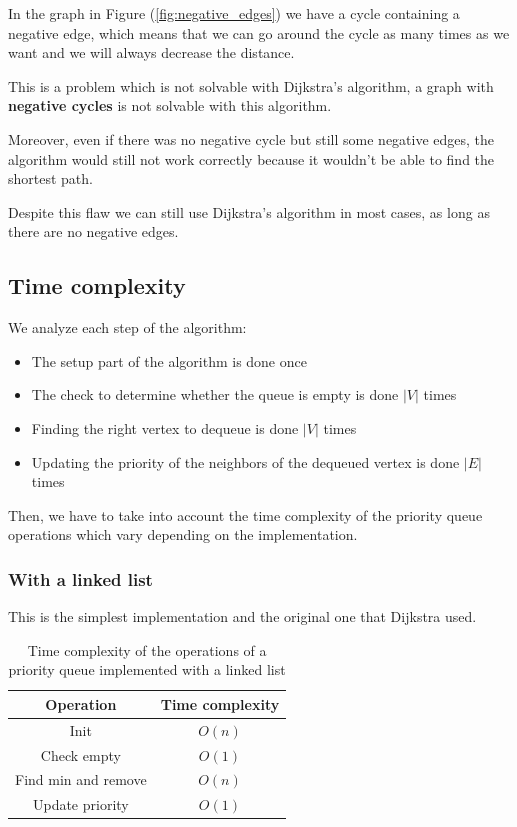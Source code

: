\documentclass[12pt]{extarticle}
\begin{document}
In the graph in Figure (\ref{fig:negative_edges}) we have a cycle containing a negative edge, which means that we can go around the cycle as many times as we want and we will always decrease the distance.

This is a problem which is not solvable with Dijkstra's algorithm, a graph with \textbf{negative cycles} is not solvable with this algorithm.

Moreover, even if there was no negative cycle but still some negative edges, the algorithm would still not work correctly because it wouldn't be able to find the shortest path.

Despite this flaw we can still use Dijkstra's algorithm in most cases, as long as there are no negative edges.

\subsection{Time complexity}

We analyze each step of the algorithm:

\begin{itemize}
    \item The setup part of the algorithm is done once
    \item The check to determine whether the queue is empty is done $|V|$ times
    \item Finding the right vertex to dequeue is done $|V|$ times
    \item Updating the priority of the neighbors of the dequeued vertex is done $|E|$ times
\end{itemize}

Then, we have to take into account the time complexity of the priority queue operations which vary depending on the implementation.

\subsubsection{With a linked list}

This is the simplest implementation and the original one that Dijkstra used.

\begin{table}[H]
    \centering
    \begin{tabular}{|c|c|}
        \hline
        \textbf{Operation}  & \textbf{Time complexity} \\
        \hline
        Init                & $O(n)$                   \\
        Check empty         & $O(1)$                   \\
        Find min and remove & $O(n)$                   \\
        Update priority     & $O(1)$                   \\
        \hline
    \end{tabular}
    \caption{Time complexity of the operations of a priority queue implemented with a linked list}
    \label{tab:priorityqueue_linkedlist}
\end{table}
\end{document}
